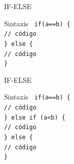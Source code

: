 \documentclass[xcolor=dvipsnames]{beamer}
\begin{document}
\begin{frame}{IF-ELSE}
\begin{block}{Sintaxis}
   {\tt
if(a==b) \{\\
\qquad // código\\
   \} else \{\\
\qquad // código\\
   \}
    }
\end{block}

\end{frame}
\begin{frame}{IF-ELSE}
\begin{block}{Sintaxis}
   {\tt
if(a==b) \{\\
\qquad // código\\
   \} else if (a<b) \{\\
\qquad // código\\
   \} else \{\\
   \qquad // código\\
      \}
    }
\end{block}

\end{frame}
\end{document}
